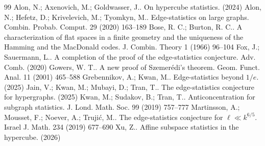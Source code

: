\documentclass[10pt,a4paper]{amsart}
\begin{document}
\begin{thebibliography}{99}
 Alon, N.; Axenovich, M.; Goldwasser, J.. On hypercube statistics. (2024)
 Alon, N.; Hefetz, D.; Krivelevich, M.; Tyomkyn, M.. Edge-statistics on large graphs. Combin. Probab. Comput. 29 (2020) 163--189
 Bose, R. C.; Burton, R. C.. A characterization of flat spaces in a finite geometry and the uniqueness of the {Hamming} and the {MacDonald} codes. J. Combin. Theory 1 (1966) 96--104
 Fox, J.; Sauermann, L.. A completion of the proof of the edge-statistics conjecture. Adv. Comb. (2020)
 Gowers, W. T.. A new proof of {Szemer{\'e}di's} theorem. Geom. Funct. Anal. 11 (2001) 465--588
 Grebennikov, A.; Kwan, M.. Edge-statistics beyond $1/e$. (2025)
 Jain, V.; Kwan, M.; Mubayi, D.; Tran, T.. The edge-statistics conjecture for hypergraphs. (2025)
 Kwan, M.; Sudakov, B.; Tran, T.. Anticoncentration for subgraph statistics. J. Lond. Math. Soc. 99 (2019) 757--777
 Martinsson, A.; Mousset, F.; Noever, A.; Truji{\'c}, M.. The edge-statistics conjecture for $\ell \ll k^{6/5}$. Israel J. Math. 234 (2019) 677--690
 Xu, Z.. Affine subspace statistics in the hypercube. (2026)
\end{thebibliography}
\end{document}
